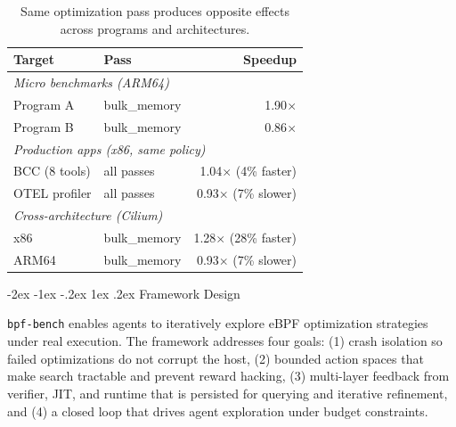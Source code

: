 \documentclass[sigplan,10pt,anonymous,nonacm]{acmart}
\makeatletter
\newcommand{\sys}{\texttt{bpf-bench}\xspace}
\renewcommand\section{\@startsection{section}{1}{\z@}%
  {-2ex \@plus -1ex \@minus -.2ex}%
  {1ex \@plus .2ex}%
  {\normalfont\Large\bfseries}}
\makeatother
\begin{document}
\begin{table}[t]
\footnotesize
\centering
\setlength{\tabcolsep}{3pt}
\caption{Same optimization pass produces opposite effects across programs and architectures.}
\label{tab:motivation}
\begin{tabular}{llr}
\hline
Target & Pass & Speedup \\
\hline
\multicolumn{3}{l}{\textit{Micro benchmarks (ARM64)}} \\
Program A & bulk\_memory & 1.90$\times$ \\
Program B & bulk\_memory & 0.86$\times$ \\
\hline
\multicolumn{3}{l}{\textit{Production apps (x86, same policy)}} \\
BCC (8 tools) & all passes & 1.04$\times$ (4\% faster) \\
OTEL profiler & all passes & 0.93$\times$ (7\% slower) \\
\hline
\multicolumn{3}{l}{\textit{Cross-architecture (Cilium)}} \\
x86 & bulk\_memory & 1.28$\times$ (28\% faster) \\
ARM64 & bulk\_memory & 0.93$\times$ (7\% slower) \\
\hline
\end{tabular}
\end{table}

\section{Framework Design}

\sys enables agents to iteratively explore eBPF optimization strategies under real execution.
The framework addresses four goals: (1) crash isolation so failed optimizations do not corrupt the host, (2) bounded action spaces that make search tractable and prevent reward hacking, (3) multi-layer feedback from verifier, JIT, and runtime that is persisted for querying and iterative refinement, and (4) a closed loop that drives agent exploration under budget constraints.
\end{document}

